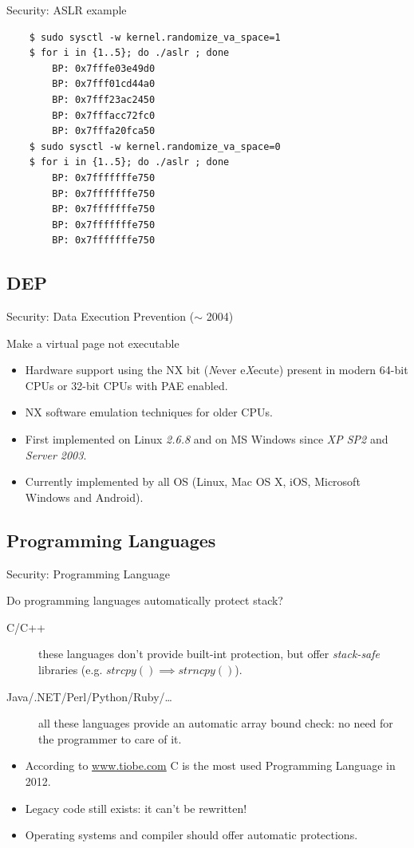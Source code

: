 \begin{frame}[fragile]{Security: ASLR example}
	\begin{lstlisting}
	$ sudo sysctl -w kernel.randomize_va_space=1
	$ for i in {1..5}; do ./aslr ; done
		BP: 0x7fffe03e49d0
		BP: 0x7fff01cd44a0
		BP: 0x7fff23ac2450
		BP: 0x7fffacc72fc0
		BP: 0x7fffa20fca50
	$ sudo sysctl -w kernel.randomize_va_space=0
	$ for i in {1..5}; do ./aslr ; done
		BP: 0x7fffffffe750
		BP: 0x7fffffffe750
		BP: 0x7fffffffe750
		BP: 0x7fffffffe750
		BP: 0x7fffffffe750
	\end{lstlisting}
\end{frame}

\subsection{DEP}
\begin{frame}{Security: Data Execution Prevention ($\sim$ 2004)}
	\begin{block}{Make a virtual page not executable}
		\begin{itemize}
			\item Hardware support using the NX bit (\emph{N}ever e\emph{X}ecute)
				present in modern 64-bit CPUs or 32-bit CPUs with PAE enabled.
			\item NX software emulation techniques for older CPUs.
			\item First implemented on Linux \emph{2.6.8} and on MS Windows since
				\emph{XP SP2} and \emph{Server 2003}.
			\item Currently implemented by all OS (Linux, Mac OS X, iOS, Microsoft Windows and Android).
		\end{itemize}
	\end{block}
\end{frame}

\subsection{Programming Languages}
\begin{frame}{Security: Programming Language}
	\begin{block}{Do programming languages automatically protect stack?}
		\begin{description}
			\item[C/C++]these languages don't provide built-int protection, but offer
				\emph{stack-safe} libraries (e.g. $strcpy() \implies strncpy()$).
			\item[Java/.NET/Perl/Python/Ruby/\ldots]all these languages provide an
				automatic array bound check: no need for the programmer to care of it.
		\end{description}
		\begin{itemize}
			\item According to \url{www.tiobe.com} C is the most used Programming Language in 2012.
			\item \alert{Legacy code still exists: it can't be rewritten!}
			\item Operating systems and compiler should offer automatic protections.
		\end{itemize}
	\end{block}
\end{frame}



